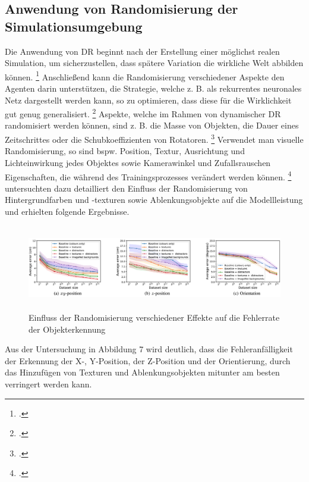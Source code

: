 \subsection{Anwendung von Randomisierung der Simulationsumgebung}

Die Anwendung von DR beginnt nach der Erstellung einer möglichst realen Simulation, um sicherzustellen, dass spätere Variation die wirkliche Welt abbilden können. \footcite[Vgl.][S. 4]{Chen.2021}
Anschließend kann die Randomisierung verschiedener Aspekte den Agenten darin unterstützen, die Strategie, welche z. B. als rekurrentes neuronales Netz dargestellt werden kann, so zu optimieren, dass diese für die Wirklichkeit gut genug generalisiert. \footcite[Vgl.][S. 4]{Chen.2021}
Aspekte, welche im Rahmen von dynamischer DR randomisiert werden können, sind z. B. die Masse von Objekten, die Dauer eines Zeitschrittes oder die Schubkoeffizienten von Rotatoren. \footcite[Vgl.][S. 4]{Molchanov.2019}
Verwendet man visuelle Randomisierung, so sind bspw. Position, Textur, Ausrichtung und Lichteinwirkung jedes Objektes sowie Kamerawinkel und Zufallsrauschen Eigenschaften, die während des Trainingsprozesses verändert werden können. \footcite[Vgl.][S. 3]{Tobin.2017}
\cite[]{Alghonaim.5302021652021} untersuchten dazu detailliert den Einfluss der Randomisierung von Hintergrundfarben und -texturen sowie Ablenkungsobjekte auf die Modellleistung und erhielten folgende Ergebnisse.

\begin{figure}[htb]
    \centering
    \includegraphics[height=3.7cm]{lib/graphics/influence_visual_randomness.png}
    \caption[Einfluss der Randomisierung verschiedener Effekte auf die Fehlerrate der Objekterkennung]{Einfluss der Randomisierung verschiedener Effekte auf die Fehlerrate der Objekterkennung\footnotemark}
    \label{abb:visual_randomization}
\end{figure}

Aus der Untersuchung in Abbildung 7 wird deutlich, dass die Fehleranfälligkeit der Erkennung der X-, Y-Position, der Z-Position und der Orientierung, durch das Hinzufügen von Texturen und Ablenkungsobjekten mitunter am besten verringert werden kann. 

